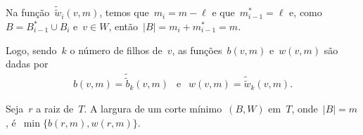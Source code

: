\begin{itemize}
	Na função~$\tilde{\tilde{w}}_{i}(v,m)$, 
	temos que~${m_i = m-\ell}$ e que~${m_{i-1}^* = \ell}$
	e, como~${B = B_{i-1}^* \cup B_i}$ e~${v\in W}$, 
	então~${|B| = m_i + m_{i-1}^*= m}$.

	\bigskip

	Logo, sendo~$k$ o número de filhos de~$v$,
	as funções~$b(v,m)$ e~$w(v,m)$ são dadas por
	\begin{align*}
		b(v,m) = \tilde{\tilde{b}}_k(v,m)\ \ \text{ e }\ \
		w(v,m) = \tilde{\tilde{w}}_k(v,m). \nonumber
	\end{align*}

	Seja~$r$ a raiz de~$T$. 
	A largura de um corte mínimo~$(B,W)$ em~$T$, onde~${|B|=m}$, 
	é~$\min\{b(r,m), w(r,m)\}$.
\end{itemize}


	\bigskip
	\bigskip
	\bigskip
